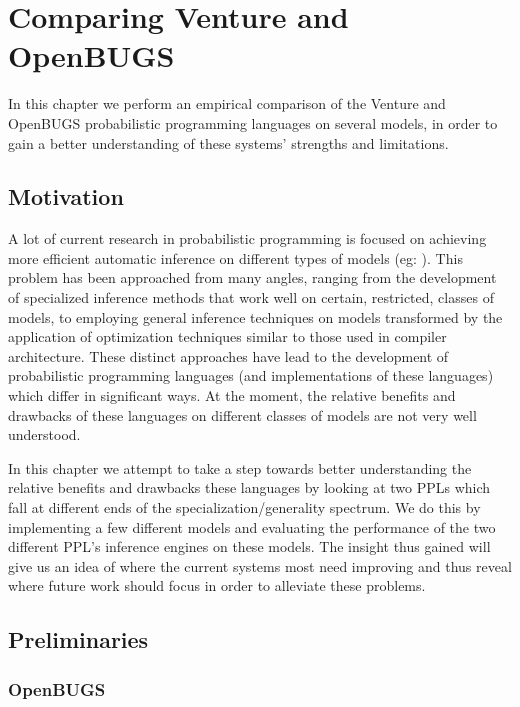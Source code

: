 \chapter{Comparing Venture and OpenBUGS}

In this chapter we perform an empirical comparison of the Venture and OpenBUGS probabilistic programming languages on several models, in order to gain a better understanding of these systems' strengths and limitations.

\section{Motivation}

A lot of current research in probabilistic programming is focused on achieving more efficient automatic inference on different types of models (eg: \cite{goodman2013principles, wingate2011nonstandard, wood2014new}). This problem has been approached from many angles, ranging from the development of specialized inference methods that work well on certain, restricted, classes of models, to employing general inference techniques on models transformed by the application of optimization techniques similar to those used in compiler architecture. These distinct approaches have lead to the development of probabilistic programming languages (and implementations of these languages) which differ in significant ways.  At the moment, the relative benefits and drawbacks of these languages on different classes of models are not very well understood. 

In this chapter we attempt to take a step towards better understanding the relative benefits and drawbacks these languages by looking at two PPLs which fall at different ends of the specialization/generality spectrum. We do this by implementing a few different models and evaluating the performance of the two different PPL's inference engines on these models. The insight thus gained will give us an idea of where the current systems most need improving and thus reveal where future work should focus in order to alleviate these problems.

\section{Preliminaries}
\subsection{OpenBUGS}

